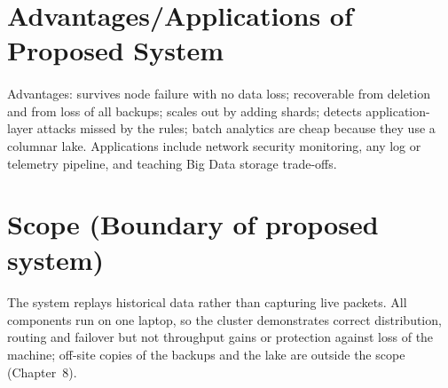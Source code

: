 \section{Advantages/Applications of Proposed System}
\paragraph{}
Advantages: survives node failure with no data loss; recoverable from deletion and from loss of all backups; scales out by adding shards; detects application-layer attacks missed by the rules; batch analytics are cheap because they use a columnar lake. Applications include network security monitoring, any log or telemetry pipeline, and teaching Big Data storage trade-offs.

\section{Scope (Boundary of proposed system)}
\paragraph{}
The system replays historical data rather than capturing live packets. All components run on one laptop, so the cluster demonstrates correct distribution, routing and failover but not throughput gains or protection against loss of the machine; off-site copies of the backups and the lake are outside the scope (Chapter~8).

